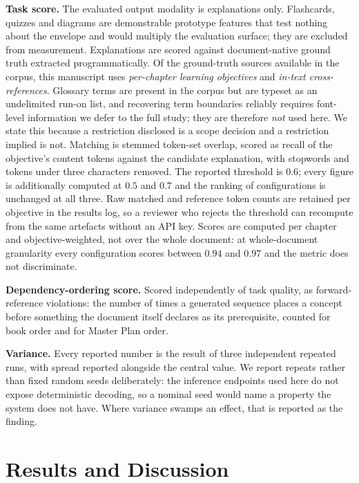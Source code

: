 \documentclass[conference]{IEEEtran}
\begin{document}
\noindent\textbf{Task score.}
The evaluated output modality is explanations only. Flashcards, quizzes and
diagrams are demonstrable prototype features that test nothing about the
envelope and would multiply the evaluation surface; they are excluded from
measurement. Explanations are scored against document-native ground truth
extracted programmatically. Of the ground-truth sources available in the
corpus, this manuscript uses \emph{per-chapter learning objectives} and
\emph{in-text cross-references}. Glossary terms are present in the corpus but
are typeset as an undelimited run-on list, and recovering term boundaries
reliably requires font-level information we defer to the full study; they are
therefore \emph{not} used here. We state this because a restriction disclosed
is a scope decision and a restriction implied is not.
Matching is stemmed token-set overlap, scored as recall of the objective's
content tokens against the candidate explanation, with stopwords and tokens
under three characters removed. The reported threshold is $0.6$; every figure
is additionally computed at $0.5$ and $0.7$ and the ranking of configurations
is unchanged at all three. Raw matched and reference token counts are retained
per objective in the results log, so a reviewer who rejects the threshold can
recompute from the same artefacts without an API key. Scores are computed
per chapter and objective-weighted, not over the whole document: at
whole-document granularity every configuration scores between $0.94$ and
$0.97$ and the metric does not discriminate.

\noindent\textbf{Dependency-ordering score.}
Scored independently of task quality, as forward-reference violations: the
number of times a generated sequence places a concept before something the
document itself declares as its prerequisite, counted for book order and for
Master Plan order.

\noindent\textbf{Variance.}
Every reported number is the result of three independent repeated runs, with
spread reported alongside the central value. We report repeats rather than
fixed random seeds deliberately: the inference endpoints used here do not
expose deterministic decoding, so a nominal seed would name a property the
system does not have. Where variance swamps an effect, that is reported as
the finding.

\section{Results and Discussion}
\label{sec:results}
\end{document}
